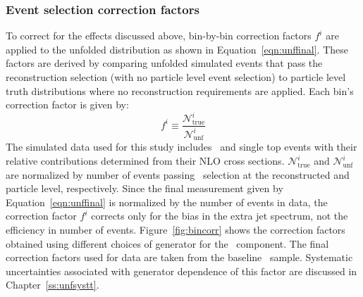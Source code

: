 \subsubsection{Event selection correction factors}
\label{ss:unfcorr}

To correct for the effects discussed above, bin-by-bin correction factors $f^i$ are applied to the 
unfolded distribution as shown in Equation~\ref{eqn:unffinal}. These factors are derived by 
comparing unfolded simulated events that pass the reconstruction selection (with no particle level event selection) to
particle level truth distributions where no reconstruction requirements are applied.
Each bin's correction factor is given by:
\begin{equation}
f^i \equiv \frac{{\mathscr N}^i_{\textrm{true}}} {{\mathscr N}^i_{\textrm{unf}}}
\label{eqn:corrf}
\end{equation}
The simulated data used for this study includes \ttbar\ and single top events with their relative contributions determined
from their NLO cross sections. ${\mathscr N}^i_{\textrm{true}}$ and ${\mathscr N}^i_{\textrm{unf}}$ are normalized by number of events passing \emubb\ selection at the reconstructed and particle level, respectively. Since the final measurement given by Equation~\ref{eqn:unffinal} is normalized by the number of events in data, the correction factor $f^i$ corrects only for the bias in the extra jet spectrum, not the efficiency in number of events.
Figure~\ref{fig:bincorr} shows the correction factors obtained using different choices of generator for the \ttbar\ component.
The final correction factors used for data are taken from the baseline \powpy\ sample. Systematic uncertainties associated with generator dependence of this factor are discussed in Chapter~\ref{ss:unfsystt}.





